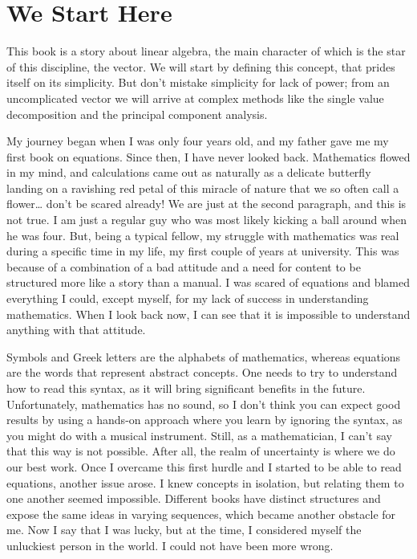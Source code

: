 \documentclass[600paper, 11pt,twoside,openany]{kdp}
\begin{document}


\chapter{We Start Here}
\par 
\indent
This book is a story about linear algebra, the main character of which is the star of this discipline, the vector. We will start by defining this concept, that prides itself on its simplicity. But don't mistake simplicity for lack of power; from an uncomplicated vector we will arrive at complex methods like the single value decomposition and the principal component analysis.
\par 
\vspace{-4pt}
\indent
My journey began when I was only four years old, and my father gave me my first book on equations. Since then, I have never looked back. Mathematics flowed in my mind, and calculations came out as naturally as a delicate butterfly landing on a ravishing red petal of this miracle of nature that we so often call a flower… don't be scared already! We are just at the second paragraph, and this is not true. I am just a regular guy who was most likely kicking a ball around when he was four. But, being a typical fellow, my struggle with mathematics was real during a specific time in my life, my first couple of years at university. This was because of a combination of a bad attitude and a need for content to be structured more like a story than a manual. I was scared of equations and blamed everything I could, except myself, for my lack of success in understanding mathematics. When I look back now, I can see that it is impossible to understand anything with that attitude.
\par 
\vspace{-4pt}
\indent Symbols and Greek letters are the alphabets of mathematics, whereas equations are the words that represent abstract concepts. One needs to try to understand how to read this syntax, as it will bring significant benefits in the future. Unfortunately, mathematics has no sound, so I don't think you can expect good results by using a hands-on approach where you learn by ignoring the syntax, as you might do with a musical instrument. Still, as a mathematician, I can’t say that this way is not possible. After all, the realm of uncertainty is where we do our best work. Once I overcame this first hurdle and I started to be able to read equations, another issue arose. I knew concepts in isolation, but relating them to one another seemed impossible. Different books have distinct structures and expose the same ideas in varying sequences, which became another obstacle for me. Now I say that I was lucky, but at the time, I considered myself the unluckiest person in the world. I could not have been more wrong.
\end{document}
